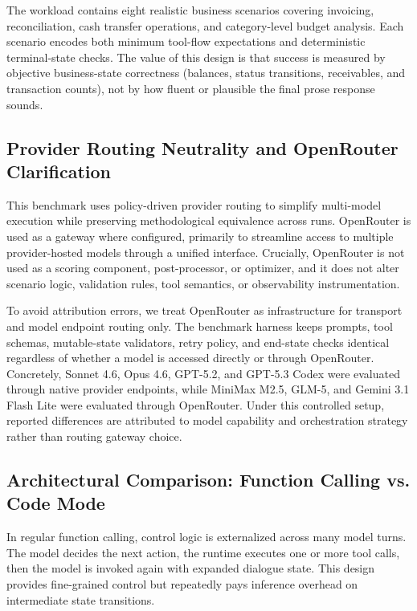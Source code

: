 \documentclass[journal,article,submit,pdftex,moreauthors]{Definitions/mdpi}
\begin{document}
The workload contains eight realistic business scenarios covering invoicing, reconciliation, cash transfer operations, and category-level budget analysis. Each scenario encodes both minimum tool-flow expectations and deterministic terminal-state checks. The value of this design is that success is measured by objective business-state correctness (balances, status transitions, receivables, and transaction counts), not by how fluent or plausible the final prose response sounds.

\subsection{Provider Routing Neutrality and OpenRouter Clarification}

This benchmark uses policy-driven provider routing to simplify multi-model execution while preserving methodological equivalence across runs. OpenRouter is used as a gateway where configured, primarily to streamline access to multiple provider-hosted models through a unified interface. Crucially, OpenRouter is not used as a scoring component, post-processor, or optimizer, and it does not alter scenario logic, validation rules, tool semantics, or observability instrumentation.

To avoid attribution errors, we treat OpenRouter as infrastructure for transport and model endpoint routing only. The benchmark harness keeps prompts, tool schemas, mutable-state validators, retry policy, and end-state checks identical regardless of whether a model is accessed directly or through OpenRouter. Concretely, Sonnet 4.6, Opus 4.6, GPT-5.2, and GPT-5.3 Codex were evaluated through native provider endpoints, while MiniMax M2.5, GLM-5, and Gemini 3.1 Flash Lite were evaluated through OpenRouter. Under this controlled setup, reported differences are attributed to model capability and orchestration strategy rather than routing gateway choice.

\subsection{Architectural Comparison: Function Calling vs. Code Mode}

In regular function calling, control logic is externalized across many model turns. The model decides the next action, the runtime executes one or more tool calls, then the model is invoked again with expanded dialogue state. This design provides fine-grained control but repeatedly pays inference overhead on intermediate state transitions.
\end{document}

